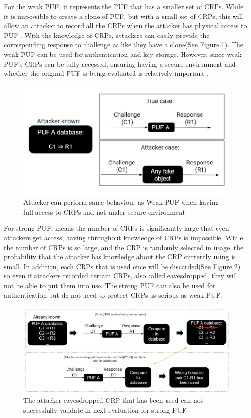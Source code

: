 For the weak PUF, it represents the PUF that has a smaller set of CRPs. While it is impossible to 
create a clone of PUF, but with a small set of CRPs, this will allow an attacker to record all the CRPs when the attacker has physical access to PUF \cite{Reference1}. With the knowledge of CRPs, attackers can easily provide the corresponding
response to challenge as like they have a clone(See Figure \ref{fig:figure2}). The weak PUF can be used for authentication and key storage. However, since weak PUF's CRPs can be fully accessed, ensuring having a secure environment and whether the original PUF is being evaluated is relatively important \cite{Reference1}.
\begin{figure}[htp]
    \centering
    \includegraphics[width=12cm]{figures/figure2.jpg}
    \caption{Attacker can perform same behaviour as Weak PUF when having full access to CRPs and not under secure environment}
    \label{fig:figure2}
    \end{figure}

For strong PUF, means the number of CRPs is significantly large that even attackers get access, having throughout knowledge of CRPs is impossible. While the number of CRPs is so large,
and the CRP is randomly selected in usage, the probability that the attacker has knowledge about the CRP currently using is small. In addition, each CRPs that is used once will 
be discarded(See Figure \ref{fig:figure3}) so even if attackers recorded certain CRPs, also called eavesdropped, they will not be able to put them into use. The strong PUF can also be used for authentication but do not need to protect CRPs
as serious as weak PUF.

\begin{figure}[htp]
    \centering
    \includegraphics[width=18cm]{figures/figure3.jpg}
    \caption{The attacker eavesdropped CRP that has been used can not successfully validate in next evaluation for strong PUF}
    \label{fig:figure3}
    \end{figure}

